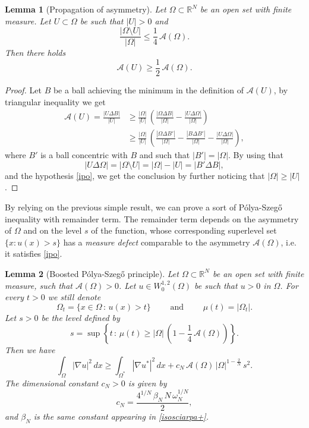 \documentclass{amsart}
\newtheorem{lemma}{Lemma}[section]
\theoremstyle{definition}
\numberwithin{equation}{section}
\begin{document}
\begin{lemma}[Propagation of asymmetry]
\label{lm:nikolai}
Let $\Omega\subset\mathbb{R}^N$ be an open set with finite measure. Let $U\subset \Omega$ be such that $|U|>0$ and
\begin{equation}
\label{ipo}
\frac{|\Omega\setminus U|}{|\Omega|}\le \frac{1}{4}\, \mathcal{A}(\Omega).
\end{equation}
Then there holds
\begin{equation}
\label{comparison}
\mathcal{A}(U)\ge \frac{1}{2}\, \mathcal{A}(\Omega).
\end{equation}
\end{lemma}
\begin{proof}
Let $B$ be a ball achieving the minimum in the definition of $\mathcal{A}(U)$, by triangular inequality we get
\[
\begin{split}
\mathcal{A}(U)=\frac{|U\Delta B|}{|U|}&\ge \frac{|\Omega|}{|U|}\,\left(\frac{|\Omega\Delta B|}{|\Omega|}-\frac{|U\Delta \Omega|}{|\Omega|}\right)\\
&\ge \frac{|\Omega|}{|U|}\,\left(\frac{|\Omega\Delta B'|}{|\Omega|}-\frac{|B\Delta B'|}{|\Omega|}-\frac{|U\Delta \Omega|}{|\Omega|}\right),
\end{split}
\]
where $B'$ is a ball concentric with $B$ and such that $|B'|=|\Omega|$. By using that
\[
|U\Delta \Omega|=|\Omega\setminus U|=|\Omega|-|U|=|B'\Delta B|,
\]
and the hypothesis \eqref{ipo}, we get the conclusion by further noticing that $|\Omega|\ge |U|$.
\end{proof}
By relying on the previous simple result, we can prove a sort of P\'olya-Szeg\H{o} inequality with remainder term. The remainder term depends on the asymmetry of $\Omega$ and on the level $s$ of the function, whose corresponding superlevel set $\{x : u(x)>s\}$
has a {\it measure defect} comparable to the asymmetry $\mathcal{A}(\Omega)$, i.e. it satisfies \eqref{ipo}.
\begin{lemma}[Boosted P\'olya-Szeg\H{o} principle]
\label{lm:PSbooster}
Let $\Omega\subset\mathbb{R}^N$ be an open set with finite measure, such that $\mathcal{A}(\Omega)>0$. Let $u\in W^{1,2}_0(\Omega)$ be such that $u>0$ in $\Omega$. For every $t>0$ we still denote
\[
\Omega_t=\{x\in\Omega\, :\, u(x)>t\}\qquad \mbox{ and }\qquad \mu(t)=|\Omega_t|.
\]
Let $s>0$ be the level defined by
\begin{equation}
\label{sceltap}
s=\sup\left\{t\, :\, \mu(t)\ge |\Omega|\,\left(1-\frac{1}{4}\,\mathcal{A}(\Omega)\right)\right\}.
\end{equation}
Then we have
\begin{equation}
\label{protop}
\int_\Omega |\nabla u|^2\, dx\ge \int_{\Omega^*} |\nabla u^*|^2\, dx+c_N\, \mathcal{A}(\Omega)\,|\Omega|^{1-\frac{2}{N}}\, s^2.
\end{equation}
The dimensional constant $c_N>0$ is given by
\[
c_N=\frac{4^{1/N}\,\beta_N\,N\,\omega_N^{1/N}}{2},
\]
and $\beta_N$ is the same constant appearing in \eqref{isosciarpa+}.
\end{lemma}
\end{document}
